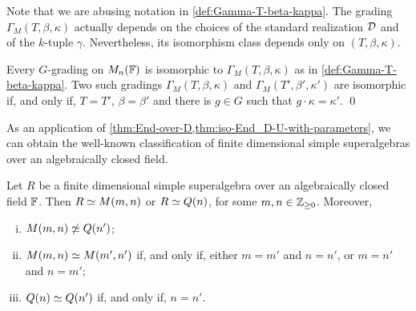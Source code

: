 Note that we are abusing notation in \cref{def:Gamma-T-beta-kappa}. 
The grading $\Gamma_M (T, \beta, \kappa)$ actually depends on the choices of the standard realization $\mathcal{D}$ and of the $k$-tuple $\gamma$. 
Nevertheless, its isomorphism class depends only on $(T, \beta, \kappa)$. 

\begin{cor}
    Every $G$-grading on $M_n(\mathbb{F})$ is isomorphic to $\Gamma_M (T, \beta, \kappa)$ as in \cref{def:Gamma-T-beta-kappa}. 
    Two such gradings $\Gamma_M (T, \beta, \kappa)$ and $\Gamma_M (T', \beta', \kappa')$ are isomorphic if, and only if, $T = T'$, $\beta = \beta'$ and there is $g\in G$ such that  $g \cdot \kappa = \kappa'$. \qed
\end{cor}

As an application of \cref{thm:End-over-D,thm:iso-End_D-U-with-parameters}, we can obtain the well-known classification of finite dimensional simple superalgebras over an algebraically closed field. 

\begin{thm}\label{thm:fd-simple-SA}
    Let $R$ be a finite dimensional simple superalgebra over an algebraically closed field $\mathbb{F}$. 
    Then $R \simeq M(m,n)$ or $R \simeq Q(n)$, for some $m,n \in \mathbb{Z}_{\geq 0}$. 
    Moreover,
    \begin{enumerate}[(i)]
        \item $M(m,n) \not\simeq Q(n')$;
        \item $M(m,n) \simeq M(m', n')$ if, and only if, either $m=m'$ and $n=n'$, or $m=n'$ and $n=m'$;
        \item $Q(n) \simeq Q(n')$ if, and only if, $n = n'$.
    \end{enumerate}
\end{thm}

